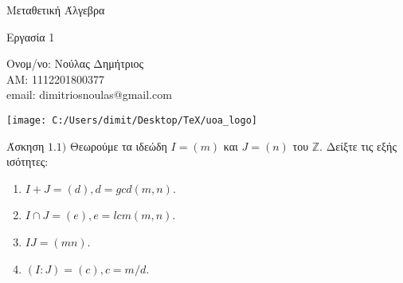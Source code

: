 \documentclass[oneside,a4paper]{article}
\newcommand {\tl}{\textlatin}
\newcommand{\Z}{\mathbb{Z}}
\begin{document}
	
	
	\begin{framed}	
		\begin{center}
			\huge Μεταθετική Άλγεβρα
		\end{center}
		\begin{center}
			\huge Εργασία 1
		\end{center}
		\vspace{0.3truecm}
		\begin{center}
			Ονομ/νο: Νούλας Δημήτριος\\
			ΑΜ: 1112201800377\\
			\tl{email}: \tl{dimitriosnoulas@gmail.com}
		\end{center}
		\vspace{0.3truecm}
	\end{framed}
	\vspace*{\fill}
	\begin{center}
	\texttt{[image: C:/Users/dimit/Desktop/TeX/uoa\_logo]}
	\end{center}
\vspace{1cm}
\pagebreak

\noindent Άσκηση $1.1)$ 
\quad Θεωρούμε τα ιδεώδη $I = (m)$ και $J = (n)$ του $\Z$. Δείξτε τις εξής ισότητες:

\begin{enumerate}
	\item	  $I+J=(d), d=gcd(m,n)$.
	\item	 $I\cap J=(e), e=lcm(m,n)$.
	\item $IJ=(mn)$.
	\item $(I:J)=(c), c=m/d$.	  \end{enumerate}
\end{document}
